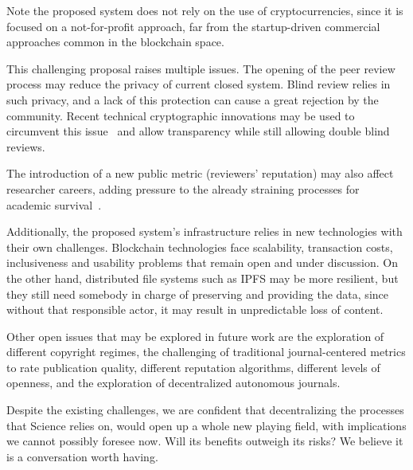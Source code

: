 Note the proposed system does not rely on the use of cryptocurrencies, since it
is focused on a not-for-profit approach, far from the startup-driven commercial
approaches common in the blockchain space.

This challenging proposal raises multiple issues. The opening of the peer review
process may reduce the privacy of current closed system. Blind review relies in
such privacy, and a lack of this protection can cause a great rejection by the
community. Recent technical cryptographic innovations may be used to circumvent
this issue~\cite{blum1988non} and allow transparency while still allowing double
blind reviews.

The introduction of a new public metric (reviewers' reputation) may also affect
researcher careers, adding pressure to the already straining processes for
academic survival~\cite{de2005publish}.

Additionally, the proposed system's infrastructure relies in new technologies
with their own challenges. Blockchain technologies face scalability, transaction
costs, inclusiveness and usability problems that remain open and under
discussion. On the other hand, distributed file systems such as IPFS may be more
resilient, but they still need somebody in charge of preserving and providing
the data, since without that responsible actor, it may result in unpredictable
loss of content.

Other open issues that may be explored in future work are the exploration of
different copyright regimes, the challenging of traditional journal-centered
metrics to rate publication quality, different reputation algorithms, different
levels of openness, and the exploration of decentralized autonomous journals.

Despite the existing challenges, we are confident that decentralizing the
processes that Science relies on, would open up a whole new playing field, with
implications we cannot possibly foresee now. Will its benefits outweigh its
risks? We believe it is a conversation worth having.


